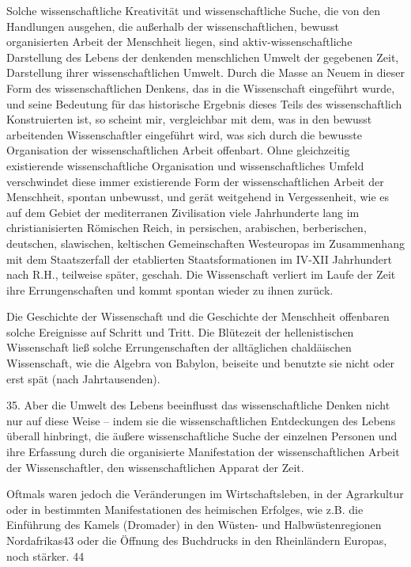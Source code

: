 \documentclass[11pt,a4paper]{book}
\begin{document}
Solche wissenschaftliche Kreativität und wissenschaftliche Suche, die von den Handlungen ausgehen, die außerhalb der wissenschaftlichen, bewusst organisierten Arbeit der Menschheit liegen, sind aktiv-wissenschaftliche Darstellung des Lebens der denkenden menschlichen Umwelt der gegebenen Zeit, Darstellung ihrer wissenschaftlichen Umwelt. Durch die Masse an Neuem in dieser Form des wissenschaftlichen Denkens, das in die Wissenschaft eingeführt wurde, und seine Bedeutung für das historische Ergebnis dieses Teils des wissenschaftlich Konstruierten ist, so scheint mir, vergleichbar mit dem, was in den bewusst arbeitenden Wissenschaftler eingeführt wird, was sich durch die bewusste Organisation der wissenschaftlichen Arbeit offenbart. Ohne gleichzeitig existierende wissenschaftliche Organisation und wissenschaftliches Umfeld verschwindet diese immer existierende Form der wissenschaftlichen Arbeit der Menschheit, spontan unbewusst, und gerät weitgehend in Vergessenheit, wie es auf dem Gebiet der mediterranen Zivilisation viele Jahrhunderte lang im christianisierten Römischen Reich, in persischen, arabischen, berberischen, deutschen, slawischen, keltischen Gemeinschaften Westeuropas im Zusammenhang mit dem Staatszerfall der etablierten Staatsformationen im IV-XII Jahrhundert nach R.H., teilweise später, geschah. Die Wissenschaft verliert im Laufe der Zeit ihre Errungenschaften und kommt spontan wieder zu ihnen zurück. 

Die Geschichte der Wissenschaft und die Geschichte der Menschheit offenbaren solche Ereignisse auf Schritt und Tritt. Die Blütezeit der hellenistischen Wissenschaft ließ solche Errungenschaften der alltäglichen chaldäischen Wissenschaft, wie die Algebra von Babylon, beiseite und benutzte sie nicht oder erst spät (nach Jahrtausenden). 

35. Aber die Umwelt des Lebens beeinflusst das wissenschaftliche Denken nicht nur auf diese Weise -- indem sie die wissenschaftlichen Entdeckungen des Lebens überall hinbringt, die äußere wissenschaftliche Suche der einzelnen Personen und ihre Erfassung durch die organisierte Manifestation der wissenschaftlichen Arbeit der Wissenschaftler, den wissenschaftlichen Apparat der Zeit. 



Oftmals waren jedoch die Veränderungen im Wirtschaftsleben, in der Agrarkultur oder in bestimmten Manifestationen des heimischen Erfolges, wie z.B. die Einführung des Kamels (Dromader) in den Wüsten- und Halbwüstenregionen Nordafrikas43 oder die Öffnung des Buchdrucks in den Rheinländern Europas, noch stärker. 44 
\end{document}
